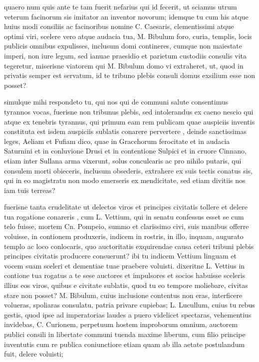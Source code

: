  quaero num quis ante te tam fuerit nefarius qui id fecerit, ut sciamus utrum veterum facinorum sis imitator an inventor novorum; idemque tu cum his atque huius modi consiliis ac facinoribus nomine C. Caesaris, clementissimi atque optimi viri, scelere vero atque audacia tua, M. Bibulum foro, curia, templis, locis publicis omnibus expulisses, inclusum domi contineres, cumque non maiestate imperi, non iure legum, sed ianuae praesidio et parietum custodiis consulis vita tegeretur, miserisne viatorem qui M. Bibulum domo vi extraheret, ut, quod in privatis semper est servatum, id te tribuno plebis consuli domus exsilium esse non posset?

 simulque mihi respondeto tu, qui nos qui de communi salute consentimus tyrannos vocas, fuerisne non tribunus plebis, sed intolerandus ex caeno nescio qui atque ex tenebris tyrannus, qui primum eam rem publicam quae auspiciis inventis constituta est isdem auspiciis sublatis conarere pervertere , deinde sanctissimas leges, Aeliam et Fufiam dico, quae in Gracchorum ferocitate et in audacia Saturnini et in conluvione Drusi et in contentione Sulpici et in cruore Cinnano, etiam inter Sullana arma vixerunt, solus conculcaris ac pro nihilo putaris, qui consulem morti obieceris, inclusum obsederis, extrahere ex suis tectis conatus sis, qui in eo magistratu non modo emerseris ex mendicitate, sed etiam divitiis nos iam tuis terreas?

 fuerisne tanta crudelitate ut delectos viros et principes civitatis tollere et delere tua rogatione conareris , cum L. Vettium, qui in senatu confessus esset se cum telo fuisse, mortem Cn. Pompeio, summo et clarissimo civi, suis manibus offerre voluisse, in contionem produxeris, indicem in rostris, in illo, inquam, augurato templo ac loco conlocaris, quo auctoritatis exquirendae causa ceteri tribuni plebis principes civitatis producere consuerunt? ibi tu indicem Vettium linguam et vocem suam sceleri et dementiae tuae praebere voluisti. dixeritne L. Vettius in contione tua rogatus a te sese auctores et impulsores et socios habuisse sceleris illius eos viros, quibus e civitate sublatis, quod tu eo tempore moliebare, civitas stare non posset? M. Bibulum, cuius inclusione contentus non eras, interficere volueras, spoliaras consulatu, patria privare cupiebas; L. Lucullum, cuius tu rebus gestis, quod ipse ad imperatorias laudes a puero videlicet spectaras, vehementius invidebas, C. Curionem, perpetuum hostem improborum omnium, auctorem publici consili in libertate communi tuenda maxime liberum, cum filio principe iuventutis cum re publica coniunctiore etiam quam ab illa aetate postulandum fuit, delere voluisti;

